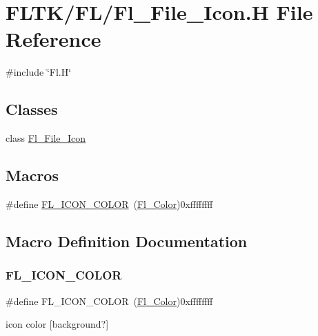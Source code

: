 \hypertarget{_fl___file___icon_8_h}{}\section{F\+L\+T\+K/\+F\+L/\+Fl\+\_\+\+File\+\_\+\+Icon.H File Reference}
\label{_fl___file___icon_8_h}
{\ttfamily \#include \char`\"{}Fl.\+H\char`\"{}}\newline
\subsection*{Classes}
\begin{DoxyCompactItemize}
\item 
class \hyperlink{class_fl___file___icon}{Fl\+\_\+\+File\+\_\+\+Icon}
\end{DoxyCompactItemize}
\subsection*{Macros}
\begin{DoxyCompactItemize}
\item 
\#define \hyperlink{_fl___file___icon_8_h_a92657f69a4c159073d4e3808f8dd09b8}{F\+L\+\_\+\+I\+C\+O\+N\+\_\+\+C\+O\+L\+OR}~(\hyperlink{_enumerations_8_h_a8b762953646f8abee866061f1af78a6a}{Fl\+\_\+\+Color})0xffffffff
\end{DoxyCompactItemize}


\subsection{Macro Definition Documentation}
\mbox{\label{_fl___file___icon_8_h_a92657f69a4c159073d4e3808f8dd09b8}} 
\subsubsection{\texorpdfstring{F\+L\+\_\+\+I\+C\+O\+N\+\_\+\+C\+O\+L\+OR}{FL\_ICON\_COLOR}}
{\footnotesize\ttfamily \#define F\+L\+\_\+\+I\+C\+O\+N\+\_\+\+C\+O\+L\+OR~(\hyperlink{_enumerations_8_h_a8b762953646f8abee866061f1af78a6a}{Fl\+\_\+\+Color})0xffffffff}

icon color \mbox{[}background?\mbox{]} 
